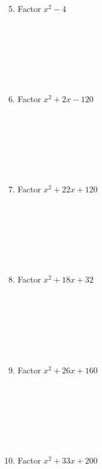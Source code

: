 \documentclass{article}
\begin{document}
\begin{minipage}[t]{0.45\textwidth}
    \begin{enumerate}
        \setcounter{enumi}{4} %
        \item Factor $x^2 - 4$
        \\\\\\\\\\\\\\
        \item Factor $x^2 + 2x - 120$
        \\\\\\\\\\\\\\
        \item Factor $x^2 + 22x + 120$
        \\\\\\\\\\\\\\
        \item Factor $x^2 + 18x + 32$
        \\\\\\\\\\\\\\
        \item Factor $x^2 + 26x + 160$
        \\\\\\\\\\\\\\
        \item Factor $x^2 + 33x + 200$
        

    \end{enumerate}
\end{minipage}

\begin{comment}
Notes:
- make ++ to ++, -- to +- table etc
- double check forms
- connect to zeros
- similar thing but a is not 1 as before
- show how graph is affected
- (x-m)(x-n) to (x+m)(x+n)
- backwards and expand to quadratic
- factor vs quadratic formula worksheet
\end{comment}
\end{document}
